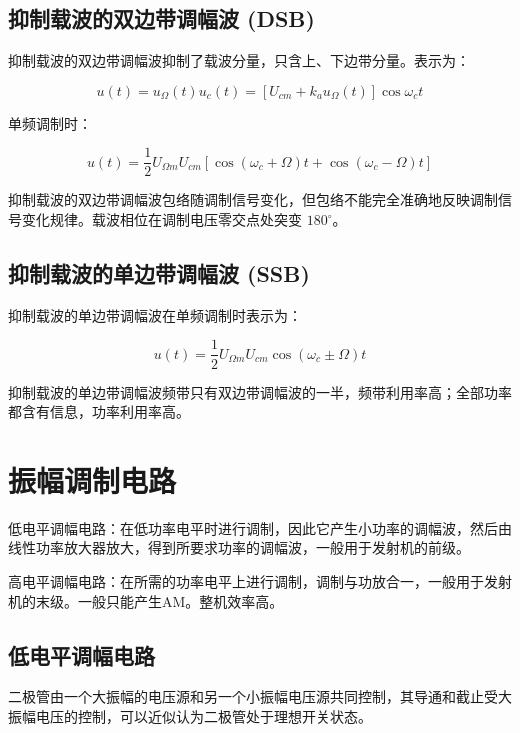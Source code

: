 \subsection{抑制载波的双边带调幅波 (DSB)}

抑制载波的双边带调幅波抑制了载波分量，只含上、下边带分量。表示为：

\begin{equation}
    u(t) = u_{\Omega}(t) u_c(t) = \left[ U_{cm} + k_a u_{\Omega}(t) \right] \cos{\omega_c t}
\end{equation}

单频调制时：

\begin{equation}
    u(t) = \frac{1}{2} U_{\Omega m } U_{cm} \left[ \cos{(\omega_c + \Omega) t} + \cos{(\omega_c - \Omega) t} \right]
\end{equation}

抑制载波的双边带调幅波包络随调制信号变化，但包络不能完全准确地反映调制信号变化规律。载波相位在调制电压零交点处突变 $180^\circ$。

\subsection{抑制载波的单边带调幅波 (SSB)}

抑制载波的单边带调幅波在单频调制时表示为：

\begin{equation}
    u(t) = \frac{1}{2} U_{\Omega m } U_{cm} \cos{(\omega_c \pm \Omega) t}
\end{equation}

抑制载波的单边带调幅波频带只有双边带调幅波的一半，频带利用率高；全部功率都含有信息，功率利用率高。

\section{振幅调制电路}

低电平调幅电路：在低功率电平时进行调制，因此它产生小功率的调幅波，然后由线性功率放大器放大，得到所要求功率的调幅波，一般用于发射机的前级。

高电平调幅电路：在所需的功率电平上进行调制，调制与功放合一，一般用于发射机的末级。一般只能产生AM。整机效率高。

\subsection{低电平调幅电路}

二极管由一个大振幅的电压源和另一个小振幅电压源共同控制，其导通和截止受大振幅电压的控制，可以近似认为二极管处于理想开关状态。

